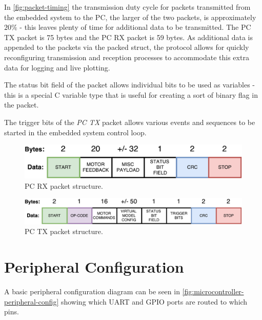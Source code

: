 In \cref{fig:packet-timing} the transmission duty cycle for packets transmitted from the embedded system to the PC, the larger of the two packets, is approximately $20 \%$ - this leaves plenty of time for additional data to be transmitted. The PC TX packet is 75 bytes and the PC RX packet is 59 bytes. As additional data is appended to the packets via the packed struct, the protocol allows for quickly reconfiguring transmission and reception processes to accommodate this extra data for logging and live plotting. 

The status bit field of the packet allows individual bits to be used as variables - this is a special C variable type that is useful for creating a sort of binary flag in the packet. 

The trigger bits of the \textit{PC TX} packet allows various events and sequences to be started in the embedded system control loop.

\begin{figure}
\centering
\includegraphics[clip, trim=0cm 0cm 0cm 0cm, page = 1, width=1\textwidth]{images/comms/pc-rx-packet.pdf} 
\caption{PC RX packet structure.}
\label{fig:pc-rx-packet}
\end{figure}

\begin{figure}
\centering
\includegraphics[clip, trim=0cm 0cm 0cm 0cm, page = 1, width=1\textwidth]{images/comms/pc-tx-packet.pdf} 
\caption{PC TX packet structure.}
\label{fig:pc-tx-packet}
\end{figure}

\section{Peripheral Configuration}

A basic peripheral configuration diagram can be seen in \cref{fig:microcontroller-peripheral-config} showing which UART and GPIO ports are routed to which pins.

